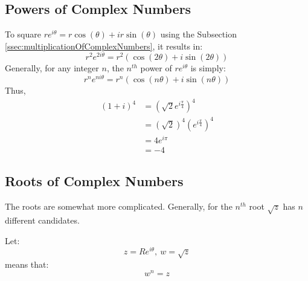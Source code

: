 \documentclass[12pt]{article}
\begin{document}
\subsection{Powers of Complex Numbers}
\label{ssec:powersOfComplexNumbers}

To square $re^{i \theta} = r\cos(\theta) + ir\sin(\theta)$ using the Subsection \ref{ssec:multiplicationOfComplexNumbers}, it results in:
\begin{equation*}
  r^2e^{2i \theta} = r^2\left(\cos(2\theta) + i\sin(2\theta)\right)
\end{equation*}
Generally, for any integer $n$, the $n^{th}$ power of $re^{i\theta}$ is simply:
\begin{equation*}
  r^ne^{ni \theta} = r^n\left(\cos(n\theta) + i\sin(n\theta)\right)
\end{equation*}
Thus,
\begin{align*}
  (1+i)^4 &= \left(\sqrt{2}e^{i \frac{\pi}{4}}\right)^4 \\
          &= \left(\sqrt{2}\right)^4\left(e^{i \frac{\pi}{4}}\right)^4 \\
          &= 4e^{i\pi} \\
          &= -4
\end{align*}

\subsection{Roots of Complex Numbers}
\label{ssec:rootsOfComplexNumbers}

The roots are somewhat more complicated. Generally, for the $n^{th}$ root $\sqrt{z}$ has $n$ different candidates.

Let:
\begin{equation*}
  z=Re^{i \theta},\ w = \sqrt{z}
\end{equation*}
means that:
\begin{equation*}
 w^n = z
\end{equation*}
\end{document}
